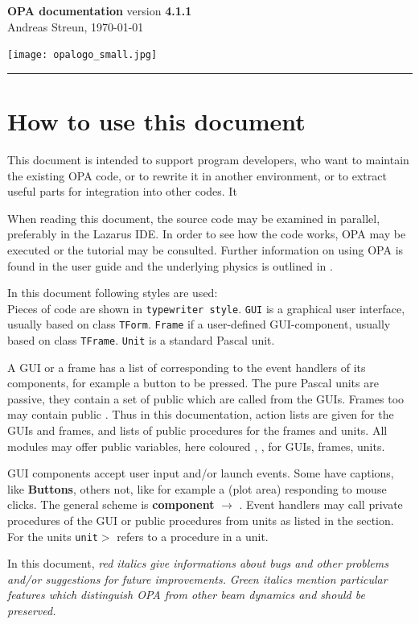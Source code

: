 \documentclass[12pt]{article}
\newcommand\code[1]{{\tt #1}}
\newcommand{\ofld}[1]{\colorbox{black!15}{{\bf #1}}}
\newcommand{\ofldx}[1]{\colorbox{black!15}{(#1)}}
\newcommand\guico[1]{{\color{blue}\code{#1}}}
\newcommand\guifco[1]{{\color{violet}\code{#1}}}
\newcommand{\unico}[1]{{\color{burntorange}\code{#1}}}
\newcommand{\evcod}[2]{\ofld{#1} $\rightarrow$ \guico{#2}}
\newcommand{\prcod}[2]{\opauni{#1}$>$\unico{#2}}
\newcommand{\opagui}[1]{\colorbox{blue!20}{\code{#1}}}
\newcommand{\opaguif}[1]{\colorbox{violet!30}{\code{#1}}}
\newcommand{\opauni}[1]{\colorbox{orange!30}{\code{#1}}}
\newcommand{\todo}[1]{{\color{red}\em #1}}
\newcommand{\feature}[1]{{\color{cadmiumgreen}\em #1}}
\begin{document}
\noindent
{}

\parbox[t]{0.7\hsize}{
  {\Huge\bf OPA documentation} version {\bf 4.1.1}\\
  Andreas Streun, \today
} \hfill  \texttt{[image: opalogo\_small.jpg]}
\rule{\hsize}{1pt}

\section{How to use this document}
This document is intended to support program developers, who want to maintain the existing OPA code, or to rewrite it in another environment, or to extract useful parts for integration into other codes. It

When reading this document, the source code may be examined in parallel, preferably in the Lazarus IDE. In order to see how the code works, OPA may be executed or the tutorial \cite{tutorial} may be consulted. Further information on using OPA is found in the user guide \cite{userguide} and the underlying physics is outlined in \cite{inside}.

In this document following styles are used:\\
Pieces of code are shown in \code{typewriter style}.
\opagui{GUI} is a graphical user interface, usually based on class \code{TForm}. \opaguif{Frame} if a user-defined GUI-component, usually based on class \code{TFrame}.  \opauni{Unit} is a standard Pascal unit. 

A GUI or a frame has a list of \guico{actions} corresponding to the event handlers of its components, for example a button to be pressed. The pure Pascal units are passive, they contain a set of public \unico{procedures} which are called from the GUIs. Frames too may contain public \guifco{procedures}. Thus in this documentation, action lists are given for the GUIs and frames, and lists of public procedures for the frames and units. All modules may offer public variables, here coloured \guico{x}, \guifco{y}, \unico{z} for GUIs, frames, units.

GUI components accept user input and/or launch events. Some have captions, like \ofld{Buttons}, others not, like for example a \ofldx{plot area} responding to mouse clicks. The general scheme is \evcod{component}{event handler}. Event handlers may call private procedures of the GUI or public procedures from units as listed in the \guico{uses} section. For the units \prcod{unit}{procedure} refers to a procedure in a unit.

In this document, \todo{red italics give informations about bugs and other problems and/or suggestions for future improvements.} \feature{Green italics mention particular features which distinguish OPA from other beam dynamics and should be preserved.}
\end{document}
